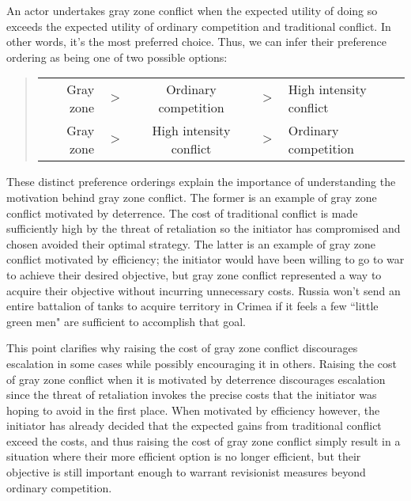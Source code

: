 \documentclass[12pt,letterpaper]{article}
\begin{document}
			An actor undertakes gray zone conflict when the expected utility of doing so exceeds the expected utility of ordinary competition and traditional conflict. In other words, it's the most preferred choice. Thus, we can infer their preference ordering as being one of two possible options:
		
				\begin{quote}
					\centering
					\begin{tabular}{rcccl}
						Gray zone & $>$ & Ordinary competition & $>$ & High intensity conflict \\
						Gray zone & $>$ & High intensity conflict & $>$ & Ordinary competition
					\end{tabular}
				\end{quote}
		
			These distinct preference orderings explain the importance of understanding the motivation behind gray zone conflict. The former is an example of gray zone conflict motivated by deterrence. The cost of traditional conflict is made sufficiently high by the threat of retaliation so the initiator has compromised and chosen avoided their optimal strategy. The latter is an example of gray zone conflict motivated by efficiency; the initiator would have been willing to go to war to achieve their desired objective, but gray zone conflict represented a way to acquire their objective without incurring unnecessary costs. Russia won't send an entire battalion of tanks to acquire territory in Crimea if it feels a few ``little green men" are sufficient to accomplish that goal.
		
			This point clarifies why raising the cost of gray zone conflict discourages escalation in some cases while possibly encouraging it in others. Raising the cost of gray zone conflict when it is motivated by deterrence discourages escalation since the threat of retaliation invokes the precise costs that the initiator was hoping to avoid in the first place. When motivated by efficiency however, the initiator has already decided that the expected gains from traditional conflict exceed the costs, and thus raising the cost of gray zone conflict simply result in a situation where their more efficient option is no longer efficient, but their objective is still important enough to warrant revisionist measures beyond ordinary competition.
		
		
\end{document}

